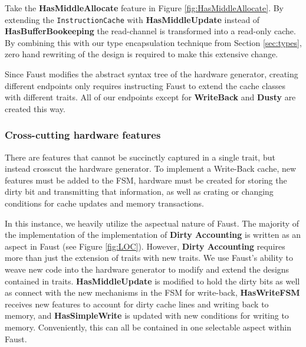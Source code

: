 \documentclass[conference]{IEEEtran}
\begin{document}
Take the \textbf{HasMiddleAllocate} feature in Figure \ref{fig:HasMiddleAllocate}. By extending the \texttt{InstructionCache} with \textbf{HasMiddleUpdate} instead of \textbf{HasBufferBookeeping} the read-channel is transformed into a read-only cache. By combining this with our type encapsulation technique from Section \ref{sec:types}, zero hand rewriting of the design is required to make this extensive change.

Since Faust modifies the abstract syntax tree of the hardware generator, creating different endpoints only requires instructing Faust to extend the cache classes with different traits. All of our endpoints except for \textbf{WriteBack} and \textbf{Dusty} are created this way.

\subsubsection{Cross-cutting hardware features}
There are features that cannot be succinctly captured in a single trait, but instead crosscut the hardware generator. To implement a Write-Back cache, new features must be added to the FSM, hardware must be created for storing the dirty bit and transmitting that information, as well as crating or changing conditions for cache updates and memory transactions. 

In this instance, we heavily utilize the aspectual nature of Faust. The majority of the implementation of the implementation of \textbf{Dirty Accounting} is written as an aspect in Faust (see Figure \ref{fig:LOC}). However, \textbf{Dirty Accounting} requires more than just the extension of traits with new traits. We use Faust's ability to weave new code into the hardware generator to modify and extend the designs contained in traits. \textbf{HasMiddleUpdate} is modified to hold the dirty bits as well as connect with the new mechanisms in the FSM for write-back, \textbf{HasWriteFSM} receives new features to account for dirty cache lines and writing back to memory, and \textbf{HasSimpleWrite} is updated with new conditions for writing to memory. Conveniently, this can all be contained in one selectable aspect within Faust.

\end{document}
